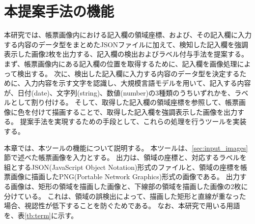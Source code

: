 \chapter{本提案手法の機能}\label{cha:Function}
本研究では、帳票画像内における記入欄の領域座標、および、その記入欄に入力する内容のデータ型をまとめたJSONファイルに加えて、検知した記入欄を強調表示した画像2枚を出力する、記入欄の検出およびラベル付与手法を提案する。
まず、帳票画像内にある記入欄の位置を取得するために、記入欄を画像処理によって検出する。
次に、検出した記入欄に入力する内容のデータ型を決定するために、入力内容を示す文字を認識し、大規模言語モデルを用いて、記入する内容が、日付(date)、文字列(string)、数値(number)の3種類のうちいずれかを、ラベルとして割り付ける。
そして、取得した記入欄の領域座標を参照して、帳票画像に色を付けて描画することで、取得した記入欄を強調表示した画像を出力する。
提案手法を実現するための手段として、これらの処理を行うツールを実装する。

本章では、本ツールの機能について説明する。
本ツールは、\ref{sec:input_images}節で述べた帳票画像を入力とする。
出力は、領域の座標と、対応するラベルを組とするJSON(JavaScript Object Notation)形式のファイルと、領域の座標を帳票画像に描画したPNG(Portable Network Graphics)形式の画像である。
出力する画像は、矩形の領域を描画した画像と、下線部の領域を描画した画像の2枚に分けている。
これは、領域の誤検出によって、描画した矩形と直線が重なった場合、視認性が低下することを防ぐためである。
なお、本研究で用いる用語を、表\ref{tb:term}に示す。

